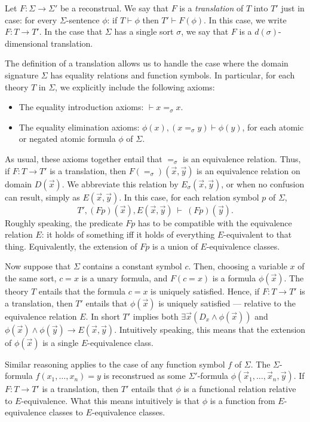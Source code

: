 \begin{defn} Let $F:\Sigma \to\Sigma '$ be a reconstrual.  We say that
  $F$ is a \emph{translation} of $T$ into $T'$ just in case: for every
  $\Sigma$-sentence $\phi$: if $T\vdash\phi$ then $T'\vdash F(\phi )$.
  In this case, we write $F:T\to T'$.  In the case that $\Sigma$ has a
  single sort $\sigma$, we say that $F$ is a $d(\sigma )$-dimensional
  translation.  \end{defn}

The definition of a translation allows us to handle the case where the
domain signature $\Sigma$ has equality relations and function symbols.
In particular, for each theory $T$ in $\Sigma$, we explicitly include
the following axioms:
\begin{itemize}
\item The equality introduction axioms: $\vdash x=_\sigma x$.
\item The equality elimination axioms:
  $\phi (x),(x=_\sigma y)\vdash \phi (y)$, for each atomic or negated
  atomic formula $\phi$ of $\Sigma$.
\end{itemize}
As usual, these axioms together entail that $=_\sigma$ is an
equivalence relation.  Thus, if $F:T\to T'$ is a translation, then
$F(=_\sigma )(\vec{x},\vec{y})$ is an equivalence relation on domain
$D(\vec{x})$.  We abbreviate this relation by
$E_\sigma (\vec{x},\vec{y})$, or when no confusion can result, simply
as $E(\vec{x},\vec{y})$.  In this case, for each relation symbol $p$
of $\Sigma$, 
\[ T',(Fp)(\vec{x}), E(\vec{x},\vec{y})\:\vdash \: (Fp)(\vec{y}) .\]
Roughly speaking, the predicate $Fp$ has to be compatible with the
equivalence relation $E$: it holds of something iff it holds of
everything $E$-equivalent to that thing.  Equivalently, the extension
of $Fp$ is a union of $E$-equivalence classes.

Now suppose that $\Sigma$ contains a constant symbol $c$.  Then,
choosing a variable $x$ of the same sort, $c=x$ is a unary formula,
and $F(c=x)$ is a formula $\phi (\vec{x})$.  The theory $T$ entails
that the formula $c=x$ is uniquely satisfied.  Hence, if $F:T\to T'$
is a translation, then $T'$ entails that $\phi (\vec{x})$ is uniquely
satisfied --- relative to the equivalence relation $E$.  In short $T'$
implies both $\exists \vec{x}(D_x\wedge \phi (\vec{x}))$ and
$\phi (\vec{x})\wedge \phi (\vec{y})\to E(\vec{x},\vec{y})$.
Intuitively speaking, this means that the extension of
$\phi (\vec{x})$ is a single $E$-equivalence class.

Similar reasoning applies to the case of any function symbol $f$ of
$\Sigma$.  The $\Sigma$-formula $f(x_1,\dots ,x_n)=y$ is reconstrued
as some $\Sigma '$-formula
$\phi (\vec{x}_1,\dots ,\vec{x}_n,\vec{y})$.  If $F:T\to T'$ is a
translation, then $T'$ entails that $\phi$ is a functional relation
relative to $E$-equivalence.  What this means intuitively is that
$\phi$ is a function from $E$-equivalence classes to $E$-equivalence
classes.

